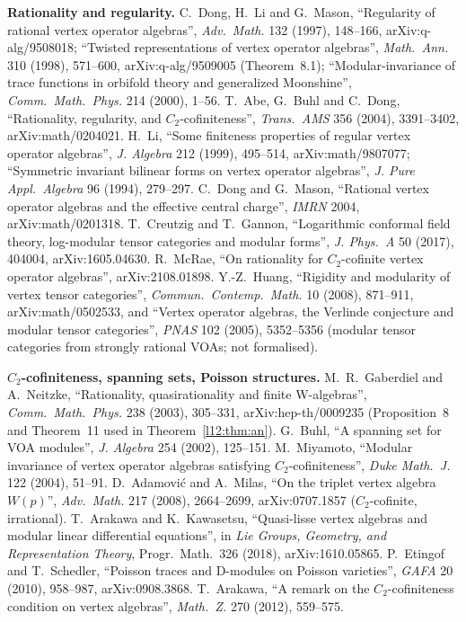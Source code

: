\textbf{Rationality and regularity.} C.~Dong, H.~Li and G.~Mason, ``Regularity of rational vertex operator algebras'',
\emph{Adv.\ Math.} 132 (1997), 148--166, arXiv:q-alg/9508018; ``Twisted representations of vertex operator algebras'',
\emph{Math.\ Ann.} 310 (1998), 571--600, arXiv:q-alg/9509005 (Theorem~8.1); ``Modular-invariance of trace functions in orbifold
theory and generalized Moonshine'', \emph{Comm.\ Math.\ Phys.} 214 (2000), 1--56. T.~Abe, G.~Buhl and C.~Dong, ``Rationality,
regularity, and $C_2$-cofiniteness'', \emph{Trans.\ AMS} 356 (2004), 3391--3402, arXiv:math/0204021. H.~Li, ``Some finiteness
properties of regular vertex operator algebras'', \emph{J. Algebra} 212 (1999), 495--514, arXiv:math/9807077; ``Symmetric
invariant bilinear forms on vertex operator algebras'', \emph{J. Pure Appl.\ Algebra} 96 (1994), 279--297. C.~Dong and
G.~Mason, ``Rational vertex operator algebras and the effective central charge'', \emph{IMRN} 2004, arXiv:math/0201318.
T.~Creutzig and T.~Gannon, ``Logarithmic conformal field theory, log-modular tensor categories and modular forms'',
\emph{J. Phys.\ A} 50 (2017), 404004, arXiv:1605.04630. R.~McRae, ``On rationality for $C_2$-cofinite vertex operator
algebras'', arXiv:2108.01898. Y.-Z.~Huang, ``Rigidity and modularity of vertex tensor categories'', \emph{Commun.\ Contemp.\
Math.} 10 (2008), 871--911, arXiv:math/0502533, and ``Vertex operator algebras, the Verlinde conjecture and modular tensor
categories'', \emph{PNAS} 102 (2005), 5352--5356 (modular tensor categories from strongly rational VOAs; not formalised).

\textbf{$C_2$-cofiniteness, spanning sets, Poisson structures.} M.~R.~Gaberdiel and A.~Neitzke, ``Rationality, quasirationality
and finite W-algebras'', \emph{Comm.\ Math.\ Phys.} 238 (2003), 305--331, arXiv:hep-th/0009235 (Proposition~8 and Theorem~11
used in Theorem~\ref{l12:thm:an}). G.~Buhl, ``A spanning set for VOA modules'', \emph{J. Algebra} 254 (2002), 125--151.
M.~Miyamoto, ``Modular invariance of vertex operator algebras satisfying $C_2$-cofiniteness'', \emph{Duke Math.\ J.} 122
(2004), 51--91. D.~Adamovi\'c and A.~Milas, ``On the triplet vertex algebra $W(p)$'', \emph{Adv.\ Math.} 217 (2008),
2664--2699, arXiv:0707.1857 ($C_2$-cofinite, irrational). T.~Arakawa and K.~Kawasetsu, ``Quasi-lisse vertex algebras and
modular linear differential equations'', in \emph{Lie Groups, Geometry, and Representation Theory}, Progr.\ Math.\ 326 (2018),
arXiv:1610.05865. P.~Etingof and T.~Schedler, ``Poisson traces and D-modules on Poisson varieties'', \emph{GAFA} 20 (2010),
958--987, arXiv:0908.3868. T.~Arakawa, ``A remark on the $C_2$-cofiniteness condition on vertex algebras'', \emph{Math.\ Z.}
270 (2012), 559--575.

